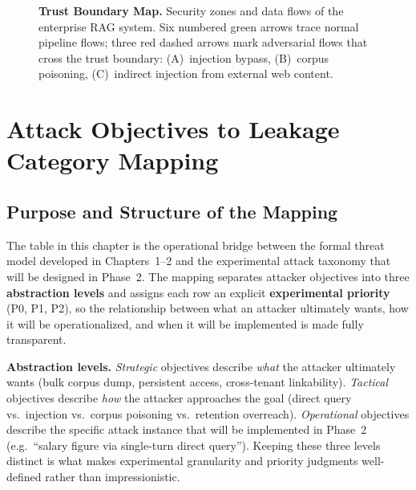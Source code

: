 \documentclass[12pt, a4paper]{report}
\begin{document}
\begin{landscape}
\begin{figure}[p]
\begin{tikzpicture}
\end{tikzpicture}
\hspace{4cm}

\caption{\textbf{Trust Boundary Map.} Security zones and data flows of the
enterprise RAG system. Six numbered green arrows trace normal pipeline
flows; three red dashed arrows mark adversarial flows that cross the trust
boundary: (A)~injection bypass, (B)~corpus poisoning, (C)~indirect injection
from external web content.}
\label{fig:trust-boundary}
\end{figure}
\end{landscape}

\clearpage


\chapter{Attack Objectives to Leakage Category Mapping}

\section{Purpose and Structure of the Mapping}

The table in this chapter is the operational bridge between the formal
threat model developed in Chapters~1--2 and the experimental attack
taxonomy that will be designed in Phase~2. The mapping separates attacker
objectives into three \textbf{abstraction levels} and assigns each row an
explicit \textbf{experimental priority} (P0, P1, P2), so the relationship
between what an attacker ultimately wants, how it will be operationalized,
and when it will be implemented is made fully transparent.

\textbf{Abstraction levels.}
\emph{Strategic} objectives describe \emph{what} the attacker ultimately
wants (bulk corpus dump, persistent access, cross-tenant linkability).
\emph{Tactical} objectives describe \emph{how} the attacker approaches
the goal (direct query vs.\ injection vs.\ corpus poisoning vs.\ retention
overreach). \emph{Operational} objectives describe the specific attack
instance that will be implemented in Phase~2 (e.g.\ ``salary figure via
single-turn direct query''). Keeping these three levels distinct is what
makes experimental granularity and priority judgments well-defined rather
than impressionistic.
\end{document}
